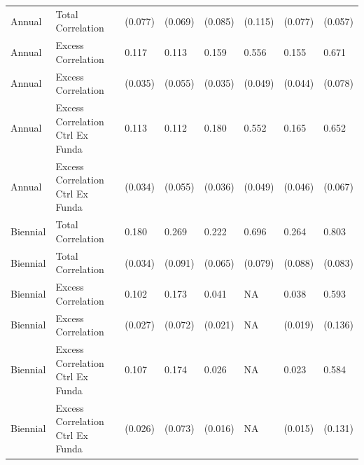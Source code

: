 \begin{tabular}{l|l|l|l|l|l|l|l}
Annual & Total Correlation & (0.077) & (0.069) & (0.085) & (0.115) & (0.077) & (0.057)\\
Annual & Excess Correlation & 0.117 & 0.113 & 0.159 & 0.556 & 0.155 & 0.671\\
Annual & Excess Correlation & (0.035) & (0.055) & (0.035) & (0.049) & (0.044) & (0.078)\\
Annual & Excess Correlation Ctrl Ex Funda & 0.113 & 0.112 & 0.180 & 0.552 & 0.165 & 0.652\\
Annual & Excess Correlation Ctrl Ex Funda & (0.034) & (0.055) & (0.036) & (0.049) & (0.046) & (0.067)\\
Biennial & Total Correlation & 0.180 & 0.269 & 0.222 & 0.696 & 0.264 & 0.803\\
Biennial & Total Correlation & (0.034) & (0.091) & (0.065) & (0.079) & (0.088) & (0.083)\\
Biennial & Excess Correlation & 0.102 & 0.173 & 0.041 & NA & 0.038 & 0.593\\
Biennial & Excess Correlation & (0.027) & (0.072) & (0.021) & NA & (0.019) & (0.136)\\
Biennial & Excess Correlation Ctrl Ex Funda & 0.107 & 0.174 & 0.026 & NA & 0.023 & 0.584\\
Biennial & Excess Correlation Ctrl Ex Funda & (0.026) & (0.073) & (0.016) & NA & (0.015) & (0.131)\\
\hline
\end{tabular}
